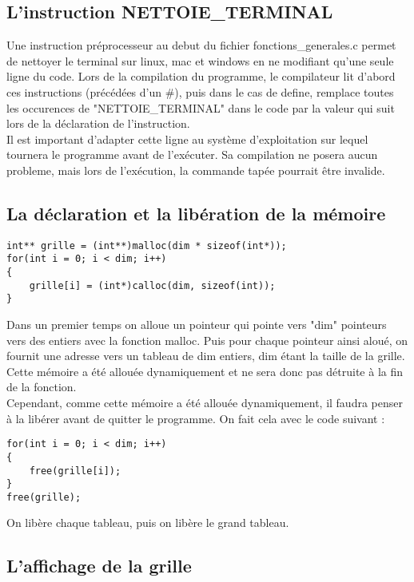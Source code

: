 \documentclass[12pt]{article}
\begin{document}
\subsection{L'instruction NETTOIE\_TERMINAL}

\indent Une instruction préprocesseur au debut du fichier fonctions\_generales.c permet de nettoyer le terminal sur linux, mac et windows en ne modifiant qu'une seule ligne du code. Lors de la compilation du programme, le compilateur lit d'abord ces instructions (précédées d'un \#), puis dans le cas de define, remplace toutes les occurences de "NETTOIE\_TERMINAL" dans le code par la valeur qui suit lors de la déclaration de l'instruction.\\
Il est important d'adapter cette ligne au système d'exploitation sur lequel tournera le programme avant de l'exécuter. Sa compilation ne posera aucun probleme, mais lors de l'exécution, la commande tapée pourrait être invalide.

\subsection{La déclaration et la libération de la mémoire}

\begin{lstlisting}[style=mystyle, caption={code pour allouer une grille}]
int** grille = (int**)malloc(dim * sizeof(int*));
for(int i = 0; i < dim; i++)
{
    grille[i] = (int*)calloc(dim, sizeof(int));
}
\end{lstlisting}

\indent Dans un premier temps on alloue un pointeur qui pointe vers "dim" pointeurs vers des entiers avec la fonction malloc. Puis pour chaque pointeur ainsi aloué, on fournit une adresse vers un tableau de dim entiers, dim étant la taille de la grille. Cette mémoire a été allouée dynamiquement et ne sera donc pas détruite à la fin de la fonction.\\
\indent Cependant, comme cette mémoire a été allouée dynamiquement, il faudra penser à la libérer avant de quitter le programme. On fait cela avec le code suivant : 
\begin{lstlisting}[style=mystyle, caption={code pour libérer une grille}]
for(int i = 0; i < dim; i++)
{
    free(grille[i]);
}
free(grille);
\end{lstlisting}
On libère chaque tableau, puis on libère le grand tableau.

\subsection{L'affichage de la grille}
\end{document}
